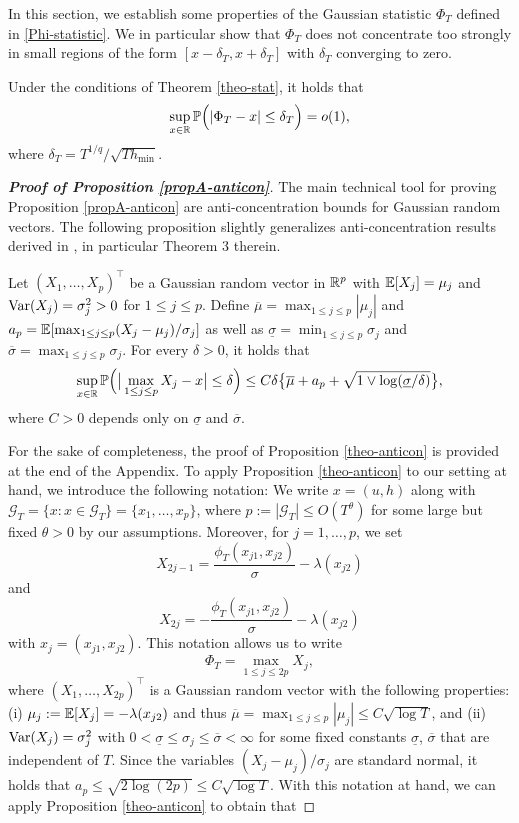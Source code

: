 \documentclass[a4paper,12pt]{article}
\numberwithin{equation}{section}
\begin{document}
In this section, we establish some properties of the Gaussian statistic $\Phi_T$ defined in \eqref{Phi-statistic}. We in particular show that $\Phi_T$ does not concentrate too strongly in small regions of the form $[x-\delta_T,x+\delta_T]$ with $\delta_T$ converging to zero.  
%
%
\enlargethispage{0.1cm}
\begin{propA}\label{propA-anticon}
Under the conditions of Theorem \ref{theo-stat}, it holds that 
\[ \sup_{x \in \mathbb{R}} \mathbb{P} \Big( | \Phi_T - x | \le \delta_T \Big) = o(1), \]
where $\delta_T = T^{1/q} / \sqrt{T h_{\min}}$.
\end{propA}
%
%
\begin{proof}[\textnormal{\textbf{Proof of Proposition \ref{propA-anticon}}}] 
The main technical tool for proving Proposition \ref{propA-anticon} are anti-concentration bounds for Gaussian random vectors. The following proposition slightly generalizes anti-concentration results derived in \cite{Chernozhukov2015}, in particular Theorem 3 therein. 
\begin{propA}\label{theo-anticon}
Let $(X_1,\ldots,X_p)^\top$ be a Gaussian random vector in $\mathbb{R}^p$ with $\mathbb{E}[X_j] = \mu_j$ and $\textnormal{Var}(X_j) = \sigma_j^2 > 0$ for $1 \le j \le p$. Define $\overline{\mu} = \max_{1 \le j \le p} |\mu_j|$ and $a_p = \mathbb{E}[ \max_{1 \le j \le p} (X_j-\mu_j)/\sigma_j ]$ as well as $\underline{\sigma} = \min_{1 \le j \le p} \sigma_j$ and $\overline{\sigma} = \max_{1 \le j \le p} \sigma_j$. For every $\delta > 0$, it holds that
\[ \sup_{x \in \mathbb{R}} \mathbb{P} \Big( \big| \max_{1 \le j \le p} X_j - x \big| \le \delta \Big) \le C \delta \big\{ \overline{\mu} + a_p + \sqrt{1 \vee \log(\underline{\sigma}/\delta)} \big\}, \]
where $C > 0$ depends only on $\underline{\sigma}$ and $\overline{\sigma}$. 
\end{propA} 
For the sake of completeness, the proof of Proposition \ref{theo-anticon} is provided at the end of the Appendix. To apply Proposition \ref{theo-anticon} to our setting at hand, we introduce the following notation: We write $x = (u,h)$ along with $\mathcal{G}_T = \{ x : x \in \mathcal{G}_T \} = \{x_1,\ldots,x_p\}$, where $p := |\mathcal{G}_T| \le O(T^\theta)$ for some large but fixed $\theta > 0$ by our assumptions. Moreover, for $j = 1,\ldots,p$, we set 
\[ X_{2j-1} = \frac{\phi_T(x_{j1},x_{j2})}{\sigma} - \lambda(x_{j2}) \]
and 
\[ X_{2j} = -\frac{\phi_T(x_{j1},x_{j2})}{\sigma} - \lambda(x_{j2}) \]
with $x_j = (x_{j1},x_{j2})$. This notation allows us to write
\[ \Phi_T = \max_{1 \le j \le 2p} X_j, \]
where $(X_1,\ldots,X_{2p})^\top$ is a Gaussian random vector with the following properties: (i) $\mu_j := \mathbb{E}[X_j] = - \lambda(x_{j2})$ and thus $\overline{\mu} = \max_{1 \le j \le p} |\mu_j| \le C \sqrt{\log T}$, and (ii) $\textnormal{Var}(X_j) = \sigma_j^2$ with $0 < \underline{\sigma} \le \sigma_j \le \overline{\sigma} < \infty$ for some fixed constants $\underline{\sigma}$, $\overline{\sigma}$ that are independent of $T$. Since the variables $(X_j - \mu_j)/\sigma_j$ are standard normal, it holds that $a_p \le \sqrt{2 \log (2p)} \le C \sqrt{\log T}$. With this notation at hand, we can apply Proposition \ref{theo-anticon} to obtain that 

\end{proof}
\end{document}
